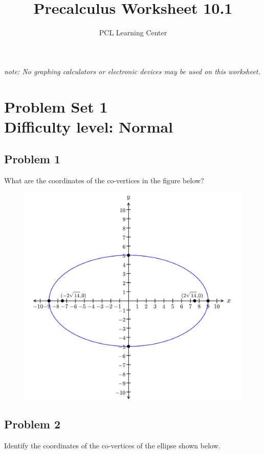 \documentclass[12pt]{article}
\title{Precalculus Worksheet 10.1}
\author{PCL Learning Center}
\date{}
\begin{document}
\maketitle

\begin{center}
    \textit{note: No graphing calculators or electronic devices may be used on this worksheet.}    
\end{center}

\section*{Problem Set 1\\Difficulty level: Normal}
\subsection*{Problem 1}
What are the coordinates of the co-vertices in the figure below?
\begin{figure}[!ht]
    \centering
    \includegraphics[width=0.9\linewidth]{1.png}
\end{figure}

\newpage
\subsection*{Problem 2}
Identify the coordinates of the co-vertices of the ellipse shown below.
\end{document}
